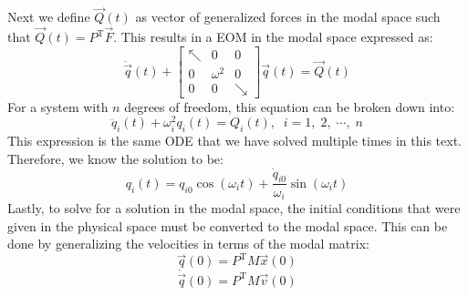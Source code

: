 \documentclass[12pt,letter]{article}
\begin{document}
	Next we define $\vec{Q}(t)$ as vector of generalized forces in the modal space such that $\vec{Q}(t) = P^{\text{T}}\vec{F}$. This results in a EOM in the modal space expressed as:
	\begin{equation}
	\ddot{\vec{q}}(t) +  \begin{bmatrix} \nwarrow & 0 & 0 \\  0  & \omega^2 & 0 \\  0  & 0 & \searrow \end{bmatrix} \vec{q}(t) = \vec{Q}(t)
	\end{equation}
	For a system with $n$ degrees of freedom, this equation can be broken down into:
	\begin{equation}
	\ddot{q}_i(t) + \omega_i^2 q_i (t) =  Q_i(t), \; \; i=1, \; 2, \; \cdots, \;n
	\end{equation}
	This expression is the same ODE that we have solved multiple times in this text. Therefore, we know the solution to be:
	\begin{equation}
	q_i(t) = q_{i0} \cos(\omega_i t) +  \frac{\dot{q}_{i0}}{\omega_i} \sin( \omega_i t)
	\end{equation}
	Lastly, to solve for a solution in the modal space, the initial conditions that were given in the physical space must be converted to the modal space. This can be done by generalizing the velocities in terms of the modal matrix:
	\begin{equation}
	\vec{q}(0) = P^\text{T} M \vec{x}(0)
	\end{equation}
	\begin{equation}
	\dot{\vec{q}}(0) = P^\text{T} M \vec{v}(0)
	\end{equation}
	
	
	
\end{document}
